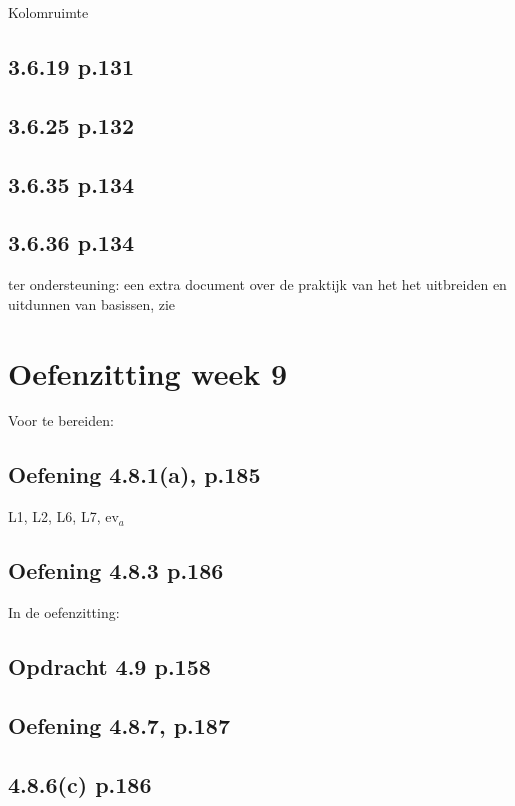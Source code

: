 \documentclass{article}
\begin{document}
Kolomruimte 

\subsection{3.6.19 p.131}

\subsection{3.6.25 p.132}

\subsection{3.6.35 p.134}

\subsection{3.6.36 p.134}


ter ondersteuning: een extra document over de praktijk van het het uitbreiden en uitdunnen van basissen, zie 


\section{Oefenzitting week 9} 

Voor te bereiden: 

\subsection{Oefening 4.8.1(a), p.185} 
L1, L2, L6, L7, ev$_a$

\subsection{Oefening 4.8.3 p.186} 


In de oefenzitting: 

\subsection{Opdracht 4.9 p.158}



\subsection{Oefening 4.8.7, p.187}

\subsection{4.8.6(c) p.186}
\end{document}
